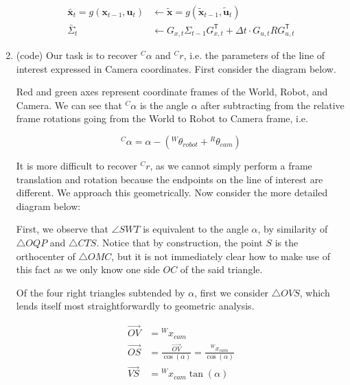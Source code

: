 \documentclass{article}
\begin{document}
\begin{enumerate}[label=(\roman*)]
\begin{equation}
\begin{aligned}
\bar{\mathbf{x}}_t = g(\mathbf{x}_{t-1}, \mathbf{u}_t) &\leftarrow \tilde{\mathbf{x}} = g(\tilde{\mathbf{x}}_{t-1}, \tilde{\mathbf{u}}_t) \\
\bar{\Sigma}_t &\leftarrow G_{x,t} \Sigma_{t-1} G_{x,t}^\mathsf{T} + \Delta t \cdot G_{u,t} R G_{u,t}^\mathsf{T}
\end{aligned}
\end{equation}

\item %
(code) Our task is to recover ${}^C\alpha$ and ${}^C r$, i.e. the parameters of the line of interest expressed in Camera coordinates. First consider the diagram below.

Red and green axes represent coordinate frames of the World, Robot, and Camera. We can see that ${}^C\alpha$ is the angle $\alpha$ after subtracting from the relative frame rotations going from the World to Robot to Camera frame, i.e.

\begin{equation}
{}^C\alpha = \alpha - ({}^W\theta_{robot} + {}^R\theta_{cam})
\end{equation}



\pagebreak

It is more difficult to recover ${}^C r$, as we cannot simply perform a frame translation and rotation because the endpoints on the line of interest are different. We approach this geometrically. Now consider the more detailed diagram below:





First, we observe that $\angle SWT$ is equivalent to the angle $\alpha$, by similarity of $\triangle OQP$ and $\triangle CTS$. Notice that by construction, the point $S$ is the orthocenter of $\triangle OMC$, but it is not immediately clear how to make use of this fact as we only know one side $OC$ of the said triangle.

Of the four right triangles subtended by $\alpha$, first we consider $\triangle OVS$, which lends itself most straightforwardly to geometric analysis.

\begin{equation}
\begin{aligned}
\overrightarrow{OV}
&= {}^W x_{cam} \\
\overrightarrow{OS}
&= \frac{\overrightarrow{OV}}{\cos(\alpha)} = \frac{{}^W x_{cam}}{\cos(\alpha)} \\
\overrightarrow{VS}
&= {}^W x_{cam} \tan(\alpha) \\
\end{aligned}
\end{equation}


\end{enumerate}
\end{document}
